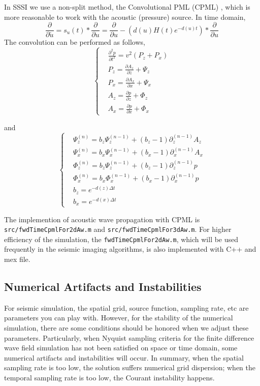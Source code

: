 \documentclass[12pt]{article}
\theoremstyle{plain}
\theoremstyle{definition}
\theoremstyle{remark}
\numberwithin{equation}{section}
\begin{document}
In SSSI we use a non-split method, the Convolutional PML (CPML) \cite{LueHun1992, RodGed2000, KomMar2007}, which is more reasonable to work with the acoustic (pressure) source. In time domain,
  \begin{equation}
    \frac{\partial}{\partial \tilde{u}} = s_u(t) * \frac{\partial}{\partial u} = \frac{\partial}{\partial u} - \left(d(u)H(t)e^{-d(u)t}\right) * \frac{\partial}{\partial u}
  \end{equation}
The convolution can be performed as follows,
  \begin{equation}
  \left\{
  \begin{aligned}
  &\frac{\partial^2 p}{\partial t^2}=v^2(P_z+P_x)\\
  &P_z=\frac{\partial A_z}{\partial z}+\Psi_z\\
  &P_x=\frac{\partial A_x}{\partial x}+\Psi_x\\
  &A_z=\frac{\partial p}{\partial z}+\Phi_z\\
  &A_x=\frac{\partial p}{\partial x}+\Phi_x
  \end{aligned}
  \right.
  \end{equation}
  
  and  
  \begin{equation}
  \left\{
  \begin{aligned}
  &\Psi_z^{(n)}=b_z\Psi_z^{(n-1)}+(b_z-1)\partial_z^{(n-1)}A_z\\
  &\Psi_x^{(n)}=b_x\Psi_x^{(n-1)}+(b_x-1)\partial_x^{(n-1)}A_x\\
  &\Phi_z^{(n)}=b_z\Psi_z^{(n-1)}+(b_z-1)\partial_z^{(n-1)}p\\
  &\Phi_x^{(n)}=b_x\Phi_x^{(n-1)}+(b_x-1)\partial_x^{(n-1)}p\\
  &b_z = e^{-d(z)\Delta t}\\
  &b_x = e^{-d(x)\Delta t}
  \end{aligned}
  \right.
  \end{equation}

The implemention of acoustic wave propagation with CPML is \texttt{src/fwdTimeCpmlFor2dAw.m} and \texttt{src/fwdTimeCpmlFor3dAw.m}.
For higher efficiency of the simulation, the \texttt{fwdTimeCpmlFor2dAw.m}, which will be used frequently in the seismic imaging algorithms, is also implemented with C++ and mex file. 

\subsection{Numerical Artifacts and Instabilities}
For seismic simulation, the spatial grid, source function, sampling rate, etc are parameters you can play with. However, 
for the stability of the numerical simulation, there are some conditions should be honored when we adjust these parameters.  
Particularly, when Nyquist sampling criteria for the finite difference wave field simulation has not been satisfied on space or time domain, some numerical artifacts and instabilities will occur. In summary, when the spatial sampling rate is too low,  the solution suffers numerical grid dispersion; when the temporal sampling rate is too low, the Courant instability happens.
\end{document}
